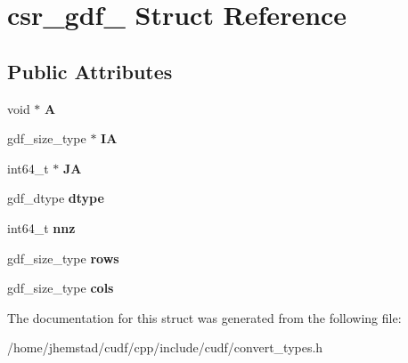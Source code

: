 \hypertarget{structcsr__gdf__}{}\section{csr\+\_\+gdf\+\_\+ Struct Reference}
\label{structcsr__gdf__}
\subsection*{Public Attributes}
\begin{DoxyCompactItemize}
\item 
void $\ast$ {\bfseries A}\hypertarget{structcsr__gdf___a6f972ffe7ff0fd85e006f5d1cb939857}{}\label{structcsr__gdf___a6f972ffe7ff0fd85e006f5d1cb939857}

\item 
gdf\+\_\+size\+\_\+type $\ast$ {\bfseries IA}\hypertarget{structcsr__gdf___a28c0d9e5a4f62a2ad9ac8024ff574162}{}\label{structcsr__gdf___a28c0d9e5a4f62a2ad9ac8024ff574162}

\item 
int64\+\_\+t $\ast$ {\bfseries JA}\hypertarget{structcsr__gdf___adbdfa7ade2fac98e8f9e6755a64eed5d}{}\label{structcsr__gdf___adbdfa7ade2fac98e8f9e6755a64eed5d}

\item 
gdf\+\_\+dtype {\bfseries dtype}\hypertarget{structcsr__gdf___a0263b7aa3fc27c2da33792900ce798a3}{}\label{structcsr__gdf___a0263b7aa3fc27c2da33792900ce798a3}

\item 
int64\+\_\+t {\bfseries nnz}\hypertarget{structcsr__gdf___a0325f7f6d04ee4950d41522e55b04e9e}{}\label{structcsr__gdf___a0325f7f6d04ee4950d41522e55b04e9e}

\item 
gdf\+\_\+size\+\_\+type {\bfseries rows}\hypertarget{structcsr__gdf___a6f946d2fd34349538c62983270813ff3}{}\label{structcsr__gdf___a6f946d2fd34349538c62983270813ff3}

\item 
gdf\+\_\+size\+\_\+type {\bfseries cols}\hypertarget{structcsr__gdf___a3c6f3eec21e1187fa6841c71e786d6da}{}\label{structcsr__gdf___a3c6f3eec21e1187fa6841c71e786d6da}

\end{DoxyCompactItemize}


The documentation for this struct was generated from the following file\+:\begin{DoxyCompactItemize}
\item 
/home/jhemstad/cudf/cpp/include/cudf/convert\+\_\+types.\+h\end{DoxyCompactItemize}
